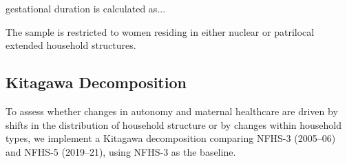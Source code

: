 \documentclass[12pt]{article}
\begin{document}
\begin{table}[!htbp]
    \centering
    \begin{threeparttable}[t]
        \caption{:  Predicting early pregnancy}

        \label{tab:earlypregnancy}
        \scriptsize
        \setlength{\tabcolsep}{10pt}
        \renewcommand{\arraystretch}{1}

        

        \begin{tablenotes}
            \item gestational duration is calculated as...
            \item The sample is restricted to women residing in either nuclear or patrilocal extended household structures. 
            
        \end{tablenotes}
    \end{threeparttable}
\end{table}


    



\subsection*{Kitagawa Decomposition}

To assess whether changes in autonomy and maternal healthcare are driven by shifts in the distribution of household structure or by changes within household types, we implement a Kitagawa decomposition \citep{kitagawa1955components} comparing NFHS-3 (2005--06) and NFHS-5 (2019--21), using NFHS-3 as the baseline.
\end{document}
